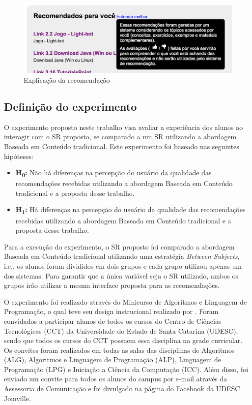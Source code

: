 \begin{figure}[htb]
  \caption{\label{fig:adaptweb-proposta-explicacao}Explicação da recomendação}
  \begin{center}
      \includegraphics[scale=0.6]{./Figuras/explicacao-das-recomendacoes.png}
  \end{center}
\end{figure}

\subsection{Definição do experimento}

O experimento proposto neste trabalho visa avaliar a experiência dos alunos ao interagir com o SR proposto, se comparado a um SR
utilizando a abordagem Baseada em Conteúdo tradicional. Este experimento foi
baseado nas seguintes hipóteses:

\begin{itemize}
\item \textbf{H\textsubscript{0}:} Não há diferenças na percepção do usuário da qualidade das recomendações recebidas utilizando a abordagem
Baseada em Conteúdo tradicional e a proposta desse trabalho.
\item \textbf{H\textsubscript{1}:} Há diferenças na percepção do usuário da qualidade das recomendações recebidas utilizando a abordagem
Baseada em Conteúdo tradicional e a proposta desse trabalho.
\end{itemize}

Para a execução do experimento, o SR proposto foi comparado a abordagem Baseada em Conteúdo tradicional utilizando uma
estratégia \textit{Between Subjects}, i.e., os alunos foram divididos em dois grupos e cada grupo utilizou apenas
um dos sistemas. Para garantir que a única variável seja o SR utilizado, ambos os grupos irão utilizar a mesma
interface proposta para as recomendações.

O experimento foi realizado através do Minicurso de Algoritmos e Linguagem de Programação, o qual teve seu design instrucional realizado por .
Foram convidados a participar alunos de todos os cursos do Centro de Ciências Tecnológicas (CCT) da Universidade do
Estado de Santa Catarina (UDESC), sendo que todos os cursos do CCT possuem essa disciplina na grade curricular. Os convites
foram realizados em todas as salas das disciplinas de Algoritmos (ALG), Algoritmos e Linguagem de Programação (ALP), Linguagem
de Programação (LPG) e Iniciação a Ciência da Computação (ICC). Além disso, foi enviado um convite para todos os alunos do
campus por e-mail através da Assessoria de Comunicação e foi divulgado na página do Facebook da UDESC Joinville.

